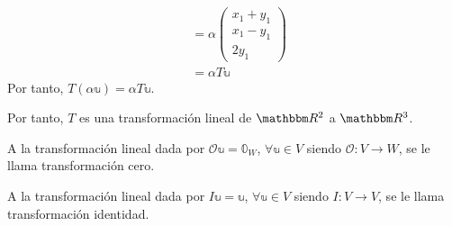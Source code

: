 \begin{example}
\begin{enumerate}[label=\roman*)]
\begin{align*}
            & = \alpha \begin{pmatrix}
                x_1 + y_1 \\
                x_1 - y_1 \\
                2 y_1
            \end{pmatrix} \\
            & = \alpha T \mathbb{u}
        \end{align*}
        Por tanto, $T(\alpha \mathbb{u}) = \alpha T\mathbb{u}$.
    \end{enumerate}
    Por tanto, $T$ es una transformación lineal de $\RR[2]$ a $\RR[3]$.
\end{example}

\begin{definition}
    A la transformación lineal dada por $\mathcal{O} \mathbb{u} = \mathbb{0}_{W}$, $\forall \mathbb{u} \in V$ siendo $\mathcal{O}:V \longrightarrow W$, se le llama transformación cero.
\end{definition}

\begin{definition}
    A la transformación lineal dada por $I \mathbb{u} = \mathbb{u}$, $\forall \mathbb{u} \in V$ siendo $I:V \longrightarrow V$, se le llama transformación identidad.
\end{definition}

